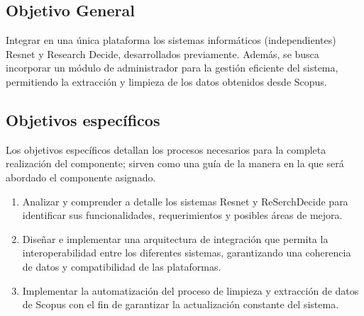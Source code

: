 \subsection{Objetivo General}
Integrar en una única plataforma los sistemas informáticos (independientes) Resnet y Research Decide, desarrollados previamente. Además, se busca incorporar un módulo de administrador para la gestión eficiente del sistema, permitiendo la extracción y limpieza de los datos obtenidos desde Scopus.

\subsection{Objetivos específicos}
Los objetivos específicos detallan los procesos necesarios para la completa realización del componente; sirven como una guía de la manera en la que será abordado el componente asignado.

\begin{enumerate}
    \item Analizar y comprender a detalle los sistemas Resnet y ReSerchDecide para identificar sus funcionalidades, requerimientos y posibles áreas de mejora. 
    \item Diseñar e implementar una arquitectura de integración que permita la interoperabilidad entre los diferentes sistemas, garantizando una coherencia de datos y compatibilidad de las plataformas. 
    \item Implementar la automatización del proceso de limpieza y extracción de datos de Scopus con el fin de garantizar la actualización constante del sistema. 
\end{enumerate}
